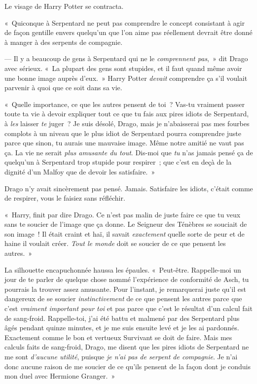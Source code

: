 Le visage de Harry Potter se contracta.

«~Quiconque à Serpentard ne peut pas comprendre le concept consistant à agir de façon gentille envers quelqu'un que l'on aime pas réellement devrait être donné à manger à des serpents de compagnie.

--- Il y a beaucoup de gens à Serpentard qui ne le \emph{comprennent pas},~» dit Drago avec sérieux. «~La plupart des gens sont stupides, et il faut quand même avoir une bonne image auprès d'eux.~» Harry Potter \emph{devait} comprendre ça s'il voulait parvenir à quoi que ce soit dans sa vie.

«~Quelle importance, ce que les autres pensent de toi~? Vas-tu vraiment passer toute ta vie à devoir expliquer tout ce que tu fais aux pires idiots de Serpentard, à \emph{les} laisser \emph{te} juger~? Je suis désolé, Drago, mais je n'abaisserai pas mes fourbes complots à un niveau que le plus idiot de Serpentard pourra comprendre juste parce que sinon, tu aurais une mauvaise image. Même notre amitié ne vaut pas ça. La vie ne serait \emph{plus amusante du tout}. Dis-moi que \emph{tu} n'as jamais pensé ça de quelqu'un à Serpentard trop stupide pour respirer~; que c'est en deçà de la dignité d'un Malfoy que de devoir les satisfaire.~»

Drago n'y avait sincèrement pas pensé. Jamais. Satisfaire les idiots, c'était comme de respirer, vous le faisiez sans réfléchir.

«~Harry, finit par dire Drago. Ce n'est pas malin de juste faire ce que tu veux sans te soucier de l'image que ça donne. Le Seigneur des Ténèbres se souciait de son image~! Il était craint et haï, il savait \emph{exactement} quelle sorte de peur et de haine il voulait créer. \emph{Tout le monde} doit se soucier de ce que pensent les autres.~»

La silhouette encapuchonnée haussa les épaules. «~Peut-être. Rappelle-moi un jour de te parler de quelque chose nommé l'expérience de conformité de Asch, tu pourrais la trouver assez amusante. Pour l'instant, je remarquerai juste qu'il est dangereux de se soucier \emph{instinctivement} de ce que pensent les autres parce que c'est \emph{vraiment important pour toi} et pas parce que c'est le résultat d'un calcul fait de sang-froid. Rappelle-toi, j'ai été battu et malmené par des Serpentard plus âgés pendant quinze minutes, et je me suis ensuite levé et je les ai pardonnés. Exactement comme le bon et vertueux Survivant se doit de faire. Mais mes calculs faits de sang-froid, Drago, me disent que les pires idiots de Serpentard ne me sont \emph{d'aucune utilité}, puisque \emph{je n'ai pas de serpent de compagnie}. Je n'ai donc aucune raison de me soucier de ce qu'ils pensent de la façon dont je conduis mon duel avec Hermione Granger.~»


